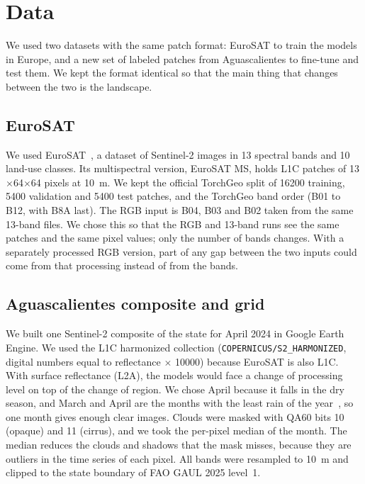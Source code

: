 \section{Data}\label{sec:data}

We used two datasets with the same patch format: EuroSAT to train the models in Europe, and a
new set of labeled patches from Aguascalientes to fine-tune and test them. We kept the format
identical so that the main thing that changes between the two is the landscape.

\subsection{EuroSAT}

We used EuroSAT~\cite{helber2019eurosat}, a dataset of Sentinel-2
images in 13 spectral bands and 10 land-use classes. Its multispectral version, EuroSAT MS, holds
L1C patches of 13$\times$64$\times$64 pixels at 10~m. We kept the official TorchGeo split of \num{16200} training,
\num{5400} validation and \num{5400} test patches, and the TorchGeo band order (B01 to B12, with B8A last).
The RGB input is B04, B03 and B02 taken from the same 13-band files. We chose this so that the
RGB and 13-band runs see the same patches and the same pixel values; only the number of bands
changes. With a separately processed RGB version, part of any gap between the two inputs could
come from that processing instead of from the bands.

\subsection{Aguascalientes composite and grid}

We built one Sentinel-2 composite of the state for April 2024 in Google Earth Engine. We used
the L1C harmonized collection (\texttt{COPERNICUS/S2\_HARMONIZED}, digital numbers equal to
reflectance $\times$ \num{10000}) because EuroSAT is also L1C. With surface reflectance (L2A), the
models would face a change of processing level on top of the change of region. We chose April
because it falls in the dry season, and March and April are the months with the least rain of
the year~\cite{inagua2022planhidrico}, so one month gives enough clear images. Clouds were
masked with QA60 bits 10 (opaque) and 11 (cirrus), and we took the per-pixel median of the month.
The median reduces the clouds and shadows that the mask misses, because they are outliers in the
time series of each pixel. All bands were resampled to 10~m and clipped to the state boundary
of FAO GAUL 2025 level~1.

